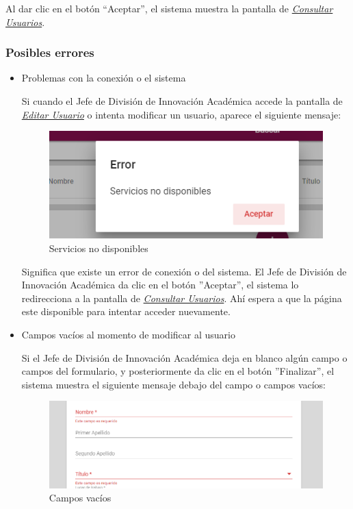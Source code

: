 Al dar clic en el botón “Aceptar”, el sistema muestra la pantalla de \hyperlink{consultarUs}{\textit{Consultar Usuarios}}.

\subsubsection{Posibles errores}
\begin{itemize}
	\item Problemas con la conexión o el sistema
	
	Si cuando el Jefe de División de Innovación Académica  accede la pantalla de \hyperlink{editarUs}{\textit{Editar Usuario}} o intenta modificar un usuario, aparece el siguiente mensaje:
	\clearpage
	\begin{figure}[H]
		\centering
		\includegraphics[width=0.4\linewidth]{images/SP5/MSGSN}
		\caption{Servicios no disponibles}
		
	\end{figure}
	
	
	Significa que existe un error de conexión o del sistema. El Jefe de División de Innovación Académica  da clic en el botón ''Aceptar'', el sistema lo redirecciona  a la pantalla de \hyperlink{consultarUs}{\textit{Consultar Usuarios}}. Ahí  espera a que la página este disponible para intentar acceder nuevamente.
	
	\item Campos vacíos al momento de modificar al usuario
	
	Si el Jefe de División de Innovación Académica  deja en blanco algún campo o campos del formulario, y posteriormente da clic en el botón ''Finalizar'', el sistema muestra el siguiente mensaje debajo del campo o campos vacíos:
	
	\begin{figure}[H]
		\centering
		\includegraphics[width=0.4\linewidth]{images/SP5/MSG44}
		\caption{Campos vacíos}
		\label{mensaje44}
		
	\end{figure}
	

\end{itemize}
